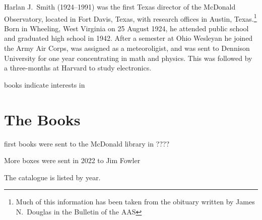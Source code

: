 

Harlan J.~Smith (1924--1991) was the first Texas director of the
McDonald Observatory, located in Fort Davis, Texas, with research
offices in Austin, Texas.\footnote{Much of this information has been
taken from the obituary written by James N.~Douglas in the Bulletin of
the AAS} Born in Wheeling, West Virginia on 25 August
1924, he attended public school and graduated high school in 1942. After
a semester at Ohio Wesleyan he joined the Army Air Corps, was assigned
as a meteoroligist, and was sent to Dennison University for one year
concentrating in math and physics. This was followed by a three-months
at Harvard to study electronics.

books indicate interests in

\section*{The Books}

first books were sent to the McDonald library in ????

More boxes were sent in 2022 to Jim Fowler

The catalogue is listed by year.
